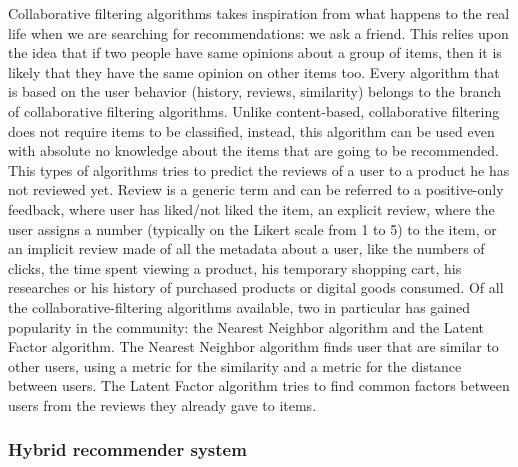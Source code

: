 \documentclass[b5paper,10pt,twoside,cucitura]{toptesi}
\begin{document}
Collaborative filtering algorithms takes inspiration from what happens to the real life when we are searching for recommendations: we ask a friend. This relies upon the idea that if two people have same opinions about a group of items, then it is likely that they have the same opinion on other items too. Every algorithm that is based on the user behavior (history, reviews, similarity) belongs to the branch of collaborative filtering algorithms. Unlike content-based, collaborative filtering does not require items to be classified, instead, this algorithm can be used even with absolute no knowledge about the items that are going to be recommended.
This types of algorithms tries to predict the reviews of a user to a product he has not reviewed yet. Review is a generic term and can be referred to a positive-only feedback, where user has liked/not liked the item, an explicit review, where the user assigns a number (typically on the Likert scale from 1 to 5)  to the item, or an implicit review made of all the metadata about a user, like the numbers of clicks, the time spent viewing a product, his temporary shopping cart, his researches or his history of purchased products or digital goods consumed. 
Of all the collaborative-filtering algorithms available, two in particular has gained popularity in the community: the Nearest Neighbor algorithm and the Latent Factor algorithm.
The Nearest Neighbor algorithm finds user that are similar to other users, using a metric for the similarity and a metric for the distance between users.
The Latent Factor algorithm tries to find common factors between users from the reviews they already gave to items.

\subsubsection{Hybrid recommender system}
\end{document}
